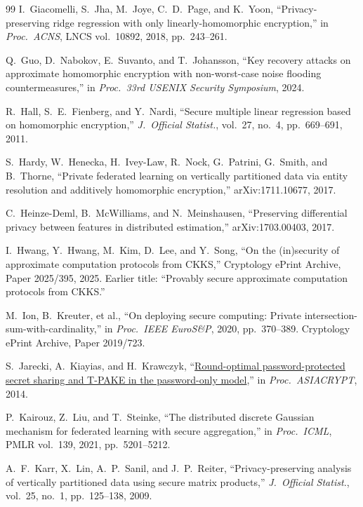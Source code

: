 \documentclass[11pt]{article}
\theoremstyle{definition}
\theoremstyle{plain}
\begin{document}
\begin{thebibliography}{99}
I.~Giacomelli, S.~Jha, M.~Joye, C.~D.~Page, and K.~Yoon,
``Privacy-preserving ridge regression with only linearly-homomorphic encryption,''
in \textit{Proc.\ ACNS}, LNCS vol.~10892, 2018, pp.\ 243--261.

Q.~Guo, D.~Nabokov, E.~Suvanto, and T.~Johansson,
``Key recovery attacks on approximate homomorphic encryption with non-worst-case noise flooding countermeasures,''
in \textit{Proc.\ 33rd USENIX Security Symposium}, 2024.

R.~Hall, S.~E.~Fienberg, and Y.~Nardi,
``Secure multiple linear regression based on homomorphic encryption,''
\textit{J.\ Official Statist.}, vol.~27, no.~4, pp.\ 669--691, 2011.

S.~Hardy, W.~Henecka, H.~Ivey-Law, R.~Nock, G.~Patrini, G.~Smith, and B.~Thorne,
``Private federated learning on vertically partitioned data via entity resolution and additively homomorphic encryption,''
arXiv:1711.10677, 2017.

C.~Heinze-Deml, B.~McWilliams, and N.~Meinshausen,
``Preserving differential privacy between features in distributed estimation,''
arXiv:1703.00403, 2017.

I.~Hwang, Y.~Hwang, M.~Kim, D.~Lee, and Y.~Song,
``On the (in)security of approximate computation protocols from CKKS,''
Cryptology ePrint Archive, Paper 2025/395, 2025. Earlier title: ``Provably secure approximate computation protocols from CKKS.''

M.~Ion, B.~Kreuter, et al.,
``On deploying secure computing: Private intersection-sum-with-cardinality,''
in \textit{Proc.\ IEEE EuroS\&P}, 2020, pp.\ 370--389. Cryptology ePrint Archive, Paper 2019/723.

S.~Jarecki, A.~Kiayias, and H.~Krawczyk,
``\href{https://doi.org/10.1007/978-3-662-45608-8_13}{Round-optimal password-protected secret sharing and T-PAKE in the password-only model},''
in \textit{Proc.\ ASIACRYPT}, 2014.

P.~Kairouz, Z.~Liu, and T.~Steinke,
``The distributed discrete Gaussian mechanism for federated learning with secure aggregation,''
in \textit{Proc.\ ICML}, PMLR vol.~139, 2021, pp.\ 5201--5212.

A.~F.~Karr, X.~Lin, A.~P.~Sanil, and J.~P.~Reiter,
``Privacy-preserving analysis of vertically partitioned data using secure matrix products,''
\textit{J.\ Official Statist.}, vol.~25, no.~1, pp.\ 125--138, 2009.


\end{thebibliography}
\end{document}
